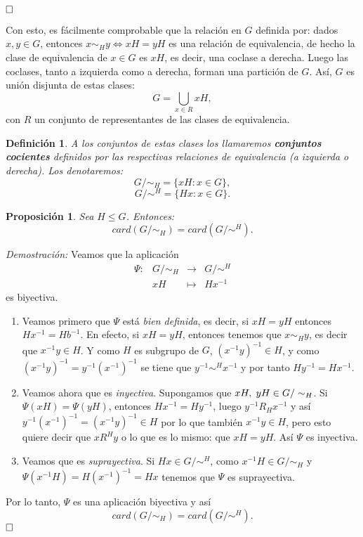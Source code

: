 \documentclass[12pt]{article}
\newtheorem{proposition}[theorem]{Proposición}
\newtheorem{definition}[theorem]{Definición}
\begin{document}
$\hfill \square$

Con esto, es fácilmente comprobable que la relación en $G$ definida por: dados $x,y \in G$, entonces $x\sim_{H} y \Longleftrightarrow xH = yH$ es una relación de equivalencia, de hecho la clase de equivalencia de $x \in G$ es $xH$, es decir, una coclase a derecha. Luego las coclases, tanto a izquierda como a derecha, forman una partición de $G$. Así, $G$ es unión disjunta de estas clases: $$G = \bigcup_{x \in R} xH,$$ con $R$ un conjunto de representantes de las clases de equivalencia.

\begin{definition}A los conjuntos de estas clases los llamaremos \textbf{conjuntos cocientes} definidos por las respectivas relaciones de equivalencia (a izquierda o derecha). Los denotaremos: $$G/\sim_{H} = \lbrace xH : x \in G \rbrace,$$ $$G/\sim^{H} = \lbrace Hx : x \in G \rbrace.$$
\end{definition}

\begin{proposition}
Sea $H \leq G$. Entonces:
$$card(G/\sim_{H})= card(G/\sim^{H}).$$
\end{proposition}
\emph{Demostración: } Veamos que la aplicación
$$
\begin{array}{rccl}
\Psi \colon &G/\sim_{H} & \longrightarrow & G/\sim^{H}\\
&xH & \longmapsto &Hx^{-1}
\end{array}
$$
es biyectiva. \begin{enumerate} 
\item Veamos primero que $\Psi$ está \textit{bien definida}, es decir, si $xH = yH$ entonces $Hx^{-1} = Hb^{-1}$. En efecto, si $xH = yH$, entonces tenemos que $x\sim_{H} y$, es decir que $x^{-1}y \in H$. Y como $H$ es subgrupo de $G$, $(x^{-1}y)^{-1} \in H$, y como $(x^{-1}y)^{-1} = y^{-1}(x^{-1})^{-1}$ se tiene que $y^{-1}\sim^{H} x^{-1}$ y por tanto $Hy^{-1} = Hx^{-1}$.
\item Veamos ahora que es \textit{inyectiva}. Supongamos que $xH, \hspace{0.1cm} yH \in G/\sim_{H}$. Si $\Psi (xH) = \Psi (yH)$, entonces $Hx^{-1} = Hy^{-1}$, luego $y^{-1}R_{H}x^{-1}$ y así $y^{-1}(x^{-1})^{-1} = (x^{-1}y)^{-1} \in H$ por lo que también $x^{-1}y \in H$, pero esto quiere decir que $x R^{H}y$ o lo que es lo mismo: que $xH = yH$. Así $\Psi$ es inyectiva.
\item Veamos que es \textit{suprayectiva}. Si $Hx \in G/\sim^{H}$, como $x^{-1}H \in G/\sim_{H}$ y $\Psi (x^{-1}H) = H(x^{-1})^{-1} = Hx$ tenemos que $\Psi$ es suprayectiva.
\end{enumerate}
Por lo tanto, $\Psi$ es una aplicación biyectiva y así $$card(G/\sim_{H}) = card(G/\sim^{H}).$$
$\hfill \square$
\end{document}
